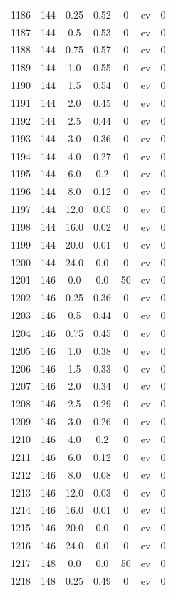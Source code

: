 \documentclass[12pt,a4paper]{article}
\begin{document}
\begin{tabular}{r|cccccc}
	1186 & 144 & 0.25 & 0.52 & 0 & ev & 0 \\
	1187 & 144 & 0.5 & 0.53 & 0 & ev & 0 \\
	1188 & 144 & 0.75 & 0.57 & 0 & ev & 0 \\
	1189 & 144 & 1.0 & 0.55 & 0 & ev & 0 \\
	1190 & 144 & 1.5 & 0.54 & 0 & ev & 0 \\
	1191 & 144 & 2.0 & 0.45 & 0 & ev & 0 \\
	1192 & 144 & 2.5 & 0.44 & 0 & ev & 0 \\
	1193 & 144 & 3.0 & 0.36 & 0 & ev & 0 \\
	1194 & 144 & 4.0 & 0.27 & 0 & ev & 0 \\
	1195 & 144 & 6.0 & 0.2 & 0 & ev & 0 \\
	1196 & 144 & 8.0 & 0.12 & 0 & ev & 0 \\
	1197 & 144 & 12.0 & 0.05 & 0 & ev & 0 \\
	1198 & 144 & 16.0 & 0.02 & 0 & ev & 0 \\
	1199 & 144 & 20.0 & 0.01 & 0 & ev & 0 \\
	1200 & 144 & 24.0 & 0.0 & 0 & ev & 0 \\
	1201 & 146 & 0.0 & 0.0 & 50 & ev & 0 \\
	1202 & 146 & 0.25 & 0.36 & 0 & ev & 0 \\
	1203 & 146 & 0.5 & 0.44 & 0 & ev & 0 \\
	1204 & 146 & 0.75 & 0.45 & 0 & ev & 0 \\
	1205 & 146 & 1.0 & 0.38 & 0 & ev & 0 \\
	1206 & 146 & 1.5 & 0.33 & 0 & ev & 0 \\
	1207 & 146 & 2.0 & 0.34 & 0 & ev & 0 \\
	1208 & 146 & 2.5 & 0.29 & 0 & ev & 0 \\
	1209 & 146 & 3.0 & 0.26 & 0 & ev & 0 \\
	1210 & 146 & 4.0 & 0.2 & 0 & ev & 0 \\
	1211 & 146 & 6.0 & 0.12 & 0 & ev & 0 \\
	1212 & 146 & 8.0 & 0.08 & 0 & ev & 0 \\
	1213 & 146 & 12.0 & 0.03 & 0 & ev & 0 \\
	1214 & 146 & 16.0 & 0.01 & 0 & ev & 0 \\
	1215 & 146 & 20.0 & 0.0 & 0 & ev & 0 \\
	1216 & 146 & 24.0 & 0.0 & 0 & ev & 0 \\
	1217 & 148 & 0.0 & 0.0 & 50 & ev & 0 \\
	1218 & 148 & 0.25 & 0.49 & 0 & ev & 0 \\

\end{tabular}
\end{document}
